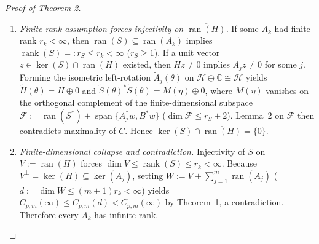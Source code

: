 \documentclass[10pt,letterpaper]{article}
\newcommand{\C}{\mathbb{C}}
\newcommand{\Hilb}{\mathcal{H}}
\newcommand{\ran}{\operatorname{ran}}
\newcommand{\rank}{\operatorname{rank}}
\begin{document}
\begin{proof}[Proof of Theorem 2]
\begin{enumerate}[leftmargin=1.6em,itemsep=2pt]
  \item \emph{Finite-rank assumption forces injectivity on $\overline{\ran(H)}$.} If some $A_k$ had finite rank $r_k < \infty$, then $\overline{\ran(S)} \subseteq \ran(A_k)$ implies $\rank(S) =: r_S \le r_k < \infty$ ($r_S \ge 1$). If a unit vector $z \in \ker(S) \cap \overline{\ran(H)}$ existed, then $Hz \neq 0$ implies $A_j z \neq 0$ for some $j$. Forming the isometric left-rotation $\widetilde{A}_j(\theta)$ on $\Hilb \oplus \C \cong \Hilb$ yields $\widetilde{H}(\theta) = H \oplus 0$ and $\widetilde{S}(\theta)^*\widetilde{S}(\theta) = M(\eta) \oplus 0$, where $M(\eta)$ vanishes on the orthogonal complement of the finite-dimensional subspace $\mathcal{F} := \ran(S^*) + \operatorname{span}\{A_j^* w, B^* w\}$ ($\dim\mathcal{F} \le r_S + 2$). Lemma~2 on $\mathcal{F}$ then contradicts maximality of $C$. Hence $\ker(S) \cap \overline{\ran(H)} = \{0\}$.
  \item \emph{Finite-dimensional collapse and contradiction.} Injectivity of $S$ on $V := \overline{\ran(H)}$ forces $\dim V \le \rank(S) \le r_k < \infty$. Because $V^\perp = \ker(H) \subseteq \ker(A_j)$, setting $W := V + \sum_{j=1}^m \ran(A_j)$ ($d := \dim W \le (m+1)r_k < \infty$) yields $C_{p,m}(\infty) \le C_{p,m}(d) < C_{p,m}(\infty)$ by Theorem~1, a contradiction. Therefore every $A_k$ has infinite rank. \qedhere
\end{enumerate}
\end{proof}
\end{document}
